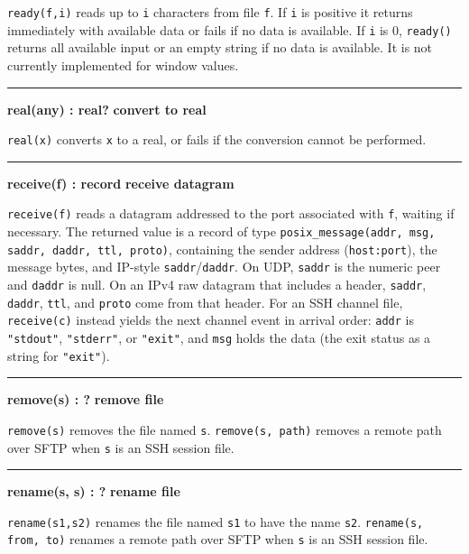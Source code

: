 \noindent
{}\texttt{ready(f,i)} reads up to \texttt{i} characters
from file \texttt{f}. If \texttt{i} is positive it returns immediately with available data or
fails if no data is available. If \texttt{i} is 0, \texttt{ready()}
returns all available input or an empty string if no data is available.
It is not currently implemented for window values.

\bigskip\hrule\vspace{0.1cm}
\noindent
{\bf real(any) : real? } \hfill {\bf convert to real}

\noindent
{}\texttt{real(x)} converts \texttt{x} to a real,
or fails if the conversion cannot be performed.

\bigskip\hrule\vspace{0.1cm}
\noindent
{\bf receive(f) : record } \hfill {\bf receive datagram}

\noindent
{}\texttt{receive(f)} reads a datagram addressed
to the port associated with \texttt{f}, waiting if necessary. The
returned value is a record of type
\texttt{posix\_message(addr, msg, saddr, daddr, ttl, proto)},
containing the sender address (\texttt{host:port}), the message
bytes, and IP-style \texttt{saddr}/\texttt{daddr}.
On UDP, \texttt{saddr} is the numeric peer and \texttt{daddr} is
null. On an IPv4 raw datagram that includes a header,
\texttt{saddr}, \texttt{daddr}, \texttt{ttl}, and \texttt{proto}
come from that header.
For an SSH channel file, \texttt{receive(c)} instead
yields the next channel event in arrival order: \texttt{addr} is
\texttt{"stdout"}, \texttt{"stderr"}, or \texttt{"exit"}, and
\texttt{msg} holds the data (the exit status as a string for
\texttt{"exit"}).

\bigskip\hrule\vspace{0.1cm}
\noindent
{\bf remove(s) : ? } \hfill {\bf remove file}

\noindent
{}\texttt{remove(s)} removes the
file named \texttt{s}. \texttt{remove(s, path)} removes a remote path
over SFTP when \texttt{s} is an SSH session file.

\bigskip\hrule\vspace{0.1cm}
\noindent
{\bf rename(s, s) : ? } \hfill {\bf rename file}

\noindent
{}\texttt{rename(s1,s2)} renames the file named
\texttt{s1} to have the name \texttt{s2}. \texttt{rename(s, from, to)}
renames a remote path over SFTP when \texttt{s} is an SSH session file.

